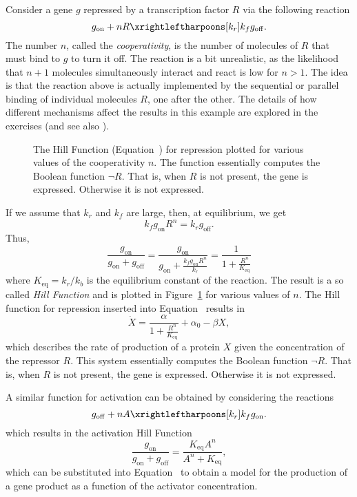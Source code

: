 \begin{example}
Consider a gene $g$ repressed by a transcription factor $R$ via the following reaction
%
$$
g_\mathrm{on} + nR \xrightleftharpoons[\text{$k_{r}$}]{\text{$k_f$}} g_\mathrm{off} . 
$$
The number $n$, called the {\em cooperativity}, is the number of
molecules of $R$ that must bind to $g$ to turn it off. The reaction is
a bit unrealistic, as the likelihood that $n+1$ molecules
simultaneously interact and react is low for $n>1$. The idea is that
the reaction above is actually implemented by the sequential or
parallel binding of individual molecules $R$, one after the other. The
details of how different mechanisms affect the results in this example
are explored in the exercises (and see also \cite{hill-misuse}). 

\begin{figure}
\caption{\label{fig:hill-repress} The Hill Function
  (Equation~) for repression plotted for
  various values of the cooperativity $n$. The function essentially
  computes the Boolean function $\neg R$. That is, when $R$ is not
  present, the gene is expressed. Otherwise it is not expressed.}
\end{figure}

If we assume that $k_r$ and $k_f$ are large, then, at equilibrium, we get
$$
k_f g_\mathrm{on} R^n = k_r g_\mathrm{off} . 
$$
Thus,
\begin{equation}\label{eq:hill-repress}
\frac{g_\mathrm{on}}{g_\mathrm{on}+g_\mathrm{off}} = 
  \frac{g_\mathrm{on}}{g_\mathrm{on}+\frac{k_f g_\mathrm{on} R^n}{k_r}} = \frac{1}{1+\frac{R^n}{K_\mathrm{eq}}} 
\end{equation}
where $K_\mathrm{eq} = k_r / k_b$ is the equilibrium constant of the
reaction. The result is a so called {\em Hill Function}
\cite{hill-function-1910} and is plotted in
Figure~\ref{fig:hill-repress} for various values of $n$. The Hill
function for repression inserted into
Equation~ results in 
%
$$
\dot X =  \frac{\alpha}{1+\frac{R^n}{K_\mathrm{eq}}}  + \alpha_0 - \beta X ,
$$
%
which describes the rate of production of a protein $X$ given the
concentration of the repressor $R$. This system essentially
  computes the Boolean function $\neg R$. That is, when $R$ is not
  present, the gene is expressed. Otherwise it is not expressed. \enx
\end{example}

\begin{example}
A similar function for activation can be obtained by considering the reactions
%
$$
g_\mathrm{off} + n A \xrightleftharpoons[\text{$k_{r}$}]{\text{$k_f$}} g_\mathrm{on} . 
$$
%
which results in the activation Hill Function
%
$$
\frac{g_\mathrm{on}}{g_\mathrm{on}+g_\mathrm{off}} = \frac{K_\mathrm{eq}A^n}{A^n + K_\mathrm{eq}},
$$
%
which can be substituted into Equation~ to
obtain a model for the production of a gene product as a function of
the activator concentration. 
%
\enx
\end{example}

